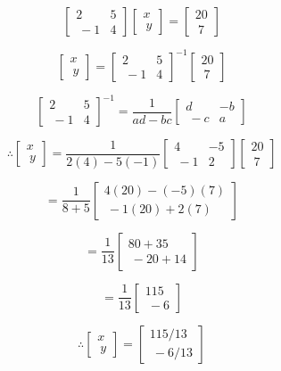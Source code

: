 $$
\begin{bmatrix}
2 & 5 \\\
-1 & 4
\end{bmatrix}
\begin{bmatrix}
x \\\
y
\end{bmatrix}
=
\begin{bmatrix}
20 \\\
7
\end{bmatrix}
$$

$$
\begin{bmatrix}
x \\\
y
\end{bmatrix}
=
\begin{bmatrix}
2 & 5 \\\
-1 & 4
\end{bmatrix}
^{-1}
\begin{bmatrix}
20 \\\
7
\end{bmatrix}
$$

$$
\begin{bmatrix}
2 & 5 \\\
-1 & 4
\end{bmatrix}
^{-1}
=
\frac{1}{ad-bc}
\begin{bmatrix}
d & -b \\\
-c & a
\end{bmatrix}
$$

$$
\therefore
\begin{bmatrix}
x \\\
y
\end{bmatrix}
=
\frac{1}{2(4)-5(-1)}
\begin{bmatrix}
4 & -5 \\\
-1 & 2
\end{bmatrix}
\begin{bmatrix}
20 \\\
7
\end{bmatrix}
$$

$$
=
\frac{1}{8+5}
\begin{bmatrix}
4(20)-(-5)(7) \\\
-1(20)+2(7)
\end{bmatrix}
$$

$$
=
\frac{1}{13}
\begin{bmatrix}
80+35 \\\
-20+14
\end{bmatrix}
$$

$$
=
\frac{1}{13}
\begin{bmatrix}
115 \\\
-6
\end{bmatrix}
$$

$$
\therefore
\begin{bmatrix}
x \\\
y
\end{bmatrix}
=
\begin{bmatrix}
115/13 \\\
-6/13
\end{bmatrix}
$$